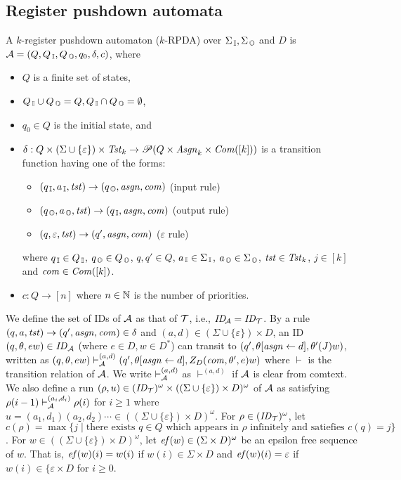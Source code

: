 \subsection{Register pushdown automata}\label{sec:RA}
\begin{definition}
A $k$-register pushdown automaton ($k$-RPDA) over $\Sigma_{\, \mathbb{I}},\Sigma_{\, \mathbb{O}}$ and $D$ is ${\cal A}=(Q, Q_{\, \mathbb{I}}, Q_{\, \mathbb{O}}, q_0, \delta, c)$, where
\begin{itemize}
\item $Q$ is a finite set of states,
\item $Q_{\, \mathbb{I}}\cup Q_{\, \mathbb{O}} = Q, Q_{\, \mathbb{I}}\cap Q_{\, \mathbb{O}} = \emptyset$,
\item $q_0\in Q$ is the initial state, and
\item $\delta: Q \times (\Sigma\cup\{\varepsilon\})\times \mathit{Tst}_k \to \mathscr{P}(Q \times\mathit{Asgn}_k\times \mathit{Com}([k]))$ is a transition function having one of the forms:
\begin{itemize}
\item $(q_{\, \mathbb{I}},a_{\, \mathbb{I}},\mathit{tst})\to(q_{\, \mathbb{O}},\mathit{asgn},\mathit{com})$ (input rule)
\item $(q_{\, \mathbb{O}},a_{\, \mathbb{O}},\mathit{tst})\to(q_{\, \mathbb{I}},\mathit{asgn},\mathit{com})$ (output rule)
\item $(q,\varepsilon,\mathit{tst})\to(q',\mathit{asgn},\mathit{com})$ ($\varepsilon$ rule)
\end{itemize}
where $q_{\, \mathbb{I}}\in Q_{\, \mathbb{I}}$, $q_{\, \mathbb{O}}\in Q_{\, \mathbb{O}}$, $q,q'\in Q$, $a_{\, \mathbb{I}}\in\Sigma_{\, \mathbb{I}}$, $a_{\, \mathbb{O}}\in\Sigma_{\, \mathbb{O}}$, $\mathit{tst}\in\mathit{Tst}_k$, $j\in[k]$ and $\mathit{com}\in\mathit{Com}([k])$.
\item $c: Q \to [n]$ where $n\in \mathbb{N}$ is the number of priorities.
\end{itemize}
\end{definition}
\noindent
We define the set of IDs of ${\cal A}$ as
that of ${\cal T}$, i.e.,
$\mathit{ID}_{\!{\cal A}}=\mathit{ID}_{{\cal T}}$.
By a rule $(q,a,\mathit{tst})\to(q',\mathit{asgn},\mathit{com})\in\delta$ and $(a,d)\in (\Sigma\cup\{\varepsilon\})\times D$,
an ID $(q,\theta,ew)\in\mathit{ID}_{\cal A}$ (where $e\in D, w\in D^*$)
can transit to $(q',\theta[\mathit{asgn}\leftarrow d], \theta'(J)w)$,
written as $(q,\theta,ew)\vdash^{(a,d)}_{\cal A}(q',\theta[\mathit{asgn}\leftarrow d], Z_D(\mathit{com},\theta',e)w)$ where $\vdash$ is the transition relation of ${\cal A}$.
We write $\vdash^{(a,d)}_{\cal A}$ as $\vdash^{(a,d)}$ if ${\cal A}$ is clear from comtext.
We also define a run $(\rho, u)\in (\mathit{ID}_{\cal T})^\omega\times ((\Sigma\cup\{\varepsilon\})\times D)^\omega$ of ${\cal A}$ as satisfying $\rho(i-1)\vdash_{\cal A}^{(a_i,d_i)}\rho(i)$ for $i\geq 1$ where $u= (a_1,d_1)(a_2,d_2)\cdots\in ((\Sigma\cup\{\varepsilon\})\times D)^\omega$.
For $\rho \in (\mathit{ID}_{\cal T})^\omega$, let $c(\rho)=\max\{j\mid
\text{there exists $q\in Q$ which appears in $\rho$}\allowbreak \text{ infinitely and satiefies $c(q)=j$}\}$.
For $w\in ((\Sigma\cup\{\varepsilon\})\times D)^\omega$, let
$\mathit{ef}(w)\in (\Sigma\times D)^\omega$ be an epsilon free sequence of $w$.
That is, $\mathit{ef}(w)(i) = w(i)$ if $w(i)\in \Sigma\times D$ and $\mathit{ef}(w)(i)=\varepsilon$ if $w(i)\in \{\varepsilon\times D$ for $i\geq 0$.

